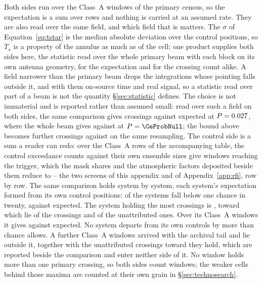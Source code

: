 Both sides run over the \CeNWin{} Class~A windows of the primary census, so
the expectation is a sum over rows and nothing is carried at an assumed rate.
They are also read over the same field, and which field that is matters.
The $\sigma$ of Equation~\ref{eq:tstar} is the median absolute deviation over
the control positions, so $T_\star$ is a property of the annulus as much as of
the cell: one product supplies both sides here, the statistic read over the
whole primary beam with each block on its own antenna geometry, for the
expectation and for the crossing count alike. A field narrower than the
primary beam drops the integrations whose pointing falls outside it, and with
them on-source time and real signal, so a statistic read over part of a beam
is not the quantity \S\ref{sec:statistic} defines. The choice is not
immaterial and is reported rather than assumed small: read over such a field
on both sides, the same comparison gives \FrNarrowObs{} crossings against
\FrNarrowExp{} expected at $P=0.027$, where the whole beam gives
\CeObs{} against \CeExp{} at $P=\CeProbNull$; the bound above becomes
\FrNarrowAddLim{} further crossings against \CeAddLim{} on the same
resampling. The control side is a sum a
reader can redo: over the \CeNWin{} Class~A rows of the accompanying table,
the control exceedance counts against their own ensemble sizes give
\CeExpTrig{} windows reaching the trigger, which the mask shares and the
atmospheric factors deposited beside them reduce to \CeExp{} -- the two
screens of this appendix and of Appendix~\ref{app:rfi}, row by row.
The same comparison holds system by system, each system's expectation formed
from its own control positions: \MtNSysLowP{} of the \MtNSysChance{} systems
fall below one chance in twenty, against \MtNSysLowPExp{} expected. The system
holding the most crossings is \MtTopStar, toward which lie
\MtTopStarNCross{} of the \EvNCrossRaw{} crossings and \MtTopStarNUnattr{} of
the unattributed ones. Over its \MtTopSysNWin{} Class~A windows it gives
\MtTopSysObs{} against \MtTopSysExp{} expected. No system departs from its
own controls by more than chance allows.
A further \CeNWinTail{} Class~A windows arrived with the archival tail and lie
outside it, together with the \CeNTailCrossWord{} unattributed crossings
toward \CeTailStar{} they hold, which are reported beside the comparison and
enter neither side of it. No window holds more than one primary crossing, so
both sides count windows; the weaker cells behind those maxima are counted at
their own grain in \S\ref{sec:technosearch}.

